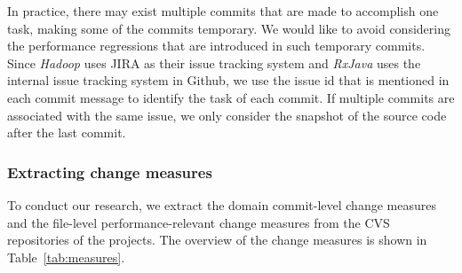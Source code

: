 In practice, there may exist multiple commits that are made to accomplish one task, making some of the commits temporary. We would like to avoid considering the performance regressions that are introduced in such temporary commits. Since \emph{Hadoop} uses JIRA as their issue tracking system and \emph{RxJava} uses the internal issue tracking system in Github, we use the issue id that is mentioned in each commit message to identify the task of each commit. If multiple commits are associated with the same issue, we only consider the snapshot of the source code after the last commit. 
\subsubsection{Extracting change measures}
To conduct our research, we extract the domain commit-level change measures and the file-level performance-relevant change measures from the CVS repositories of the projects. The overview of the change measures is shown in Table~\ref{tab:measures}.

